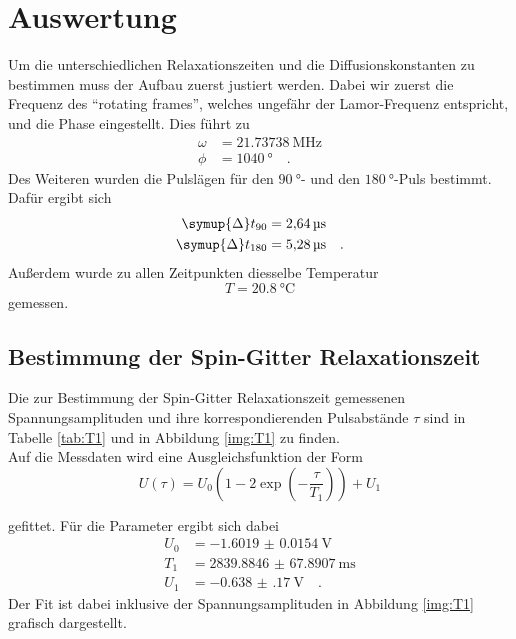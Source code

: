 \newpage 
\section{Auswertung}

\noindent
Um die unterschiedlichen Relaxationszeiten und die Diffusionskonstanten zu bestimmen muss der Aufbau zuerst justiert werden. 
Dabei wir zuerst die Frequenz des \enquote{rotating frames}, welches ungefähr der Lamor-Frequenz entspricht, und die Phase eingestellt. Dies führt zu 
\begin{align*}
  \omega &= \SI{21.73738}{\mega\hertz}\\
  \phi &= \SI{1040}{\degree} \quad .
\end{align*}
Des Weiteren wurden die Pulslägen für den $\SI{90}{\degree}$- und den $\SI{180}{\degree}$-Puls bestimmt. Dafür ergibt sich
\begin{align*}
  \symup{\Delta} t_{90} &= \SI{2.64}{\micro\second}\\
  \symup{\Delta} t_{180} &= \SI{5.28}{\micro\second} \quad .
\end{align*}
Außerdem wurde zu allen Zeitpunkten diesselbe Temperatur 
\begin{equation*}
  T = \SI{20.8}{\degreeCelsius}
\end{equation*}
gemessen.


\subsection{Bestimmung der Spin-Gitter Relaxationszeit}

\noindent
Die zur Bestimmung der Spin-Gitter Relaxationszeit gemessenen Spannungsamplituden und ihre korrespondierenden Pulsabstände $\tau$ sind in Tabelle \ref{tab:T1} und in Abbildung \ref{img:T1} zu finden.\\
Auf die Messdaten wird eine Ausgleichsfunktion der Form 
\begin{equation*}
  U\left(\tau\right) = U_0 \left(1-2\exp{\left(-\frac{\tau}{T_1}\right)}\right) + U_1
\end{equation*}

gefittet. Für die Parameter ergibt sich dabei
\begin{align*}
  U_0 &= \SI{-1.6019(154)}{\volt}\\
  T_1 &= \SI{2839.8846(678907)}{\milli\second}\\
  U_1 &= \SI{-0.638(170)}{\volt} \quad .
\end{align*}
Der Fit ist dabei inklusive der Spannungsamplituden in Abbildung \ref{img:T1} grafisch dargestellt.

